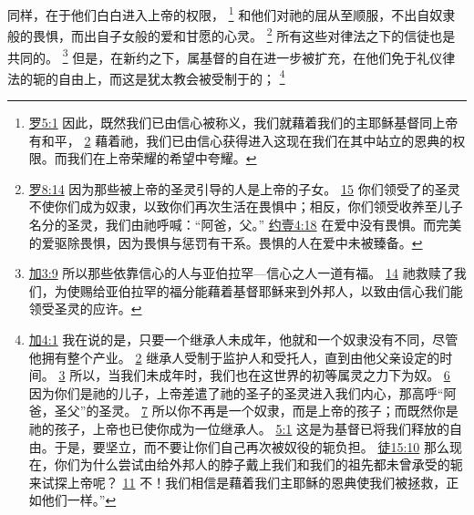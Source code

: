 \documentclass[12pt, a4paper, oneside]{ctexart}
\begin{document}
	同样，在于他们白白进入上帝的权限，
	\footnote {
		\href{https://biblehub.com/romans/5-1.htm}{罗5:1} 因此，既然我们已由信心被称义，我们就藉着我们的主耶稣基督同上帝有和平，
		\href{https://biblehub.com/romans/5-2.htm}{2} 藉着祂，我们已由信心获得进入这现在我们在其中站立的恩典的权限。而我们在上帝荣耀的希望中夸耀。

	}
	和他们对祂的屈从至顺服，不出自奴隶般的畏惧，而出自子女般的爱和甘愿的心灵。
	\footnote {
		\href{https://biblehub.com/romans/8-14.htm}{罗8:14} 因为那些被上帝的圣灵引导的人是上帝的子女。
		\href{https://biblehub.com/romans/8-15.htm}{15} 你们领受了的圣灵不使你们成为奴隶，以致你们再次生活在畏惧中；相反，你们领受收养至儿子名分的圣灵，我们由祂呼喊：“阿爸，父。”
		\href{https://biblehub.com/1_john/4-18.htm}{约壹4:18} 在爱中没有畏惧。而完美的爱驱除畏惧，因为畏惧与惩罚有干系。畏惧的人在爱中未被臻备。
	}
	所有这些对律法之下的信徒也是共同的。
	\footnote {
		\href{https://biblehub.com/galatians/3-9.htm}{加3:9} 所以那些依靠信心的人与亚伯拉罕---信心之人一道有福。
		\href{https://biblehub.com/galatians/3-14.htm}{14} 祂救赎了我们，为使赐给亚伯拉罕的福分能藉着基督耶稣来到外邦人，以致由信心我们能领受圣灵的应许。
	}
	但是，在新约之下，属基督的自在进一步被扩充，在他们免于礼仪律法的轭的自由上，而这是犹太教会被受制于的；
	\footnote {
		\href{https://biblehub.com/galatians/4-1.htm}{加4:1} 我在说的是，只要一个继承人未成年，他就和一个奴隶没有不同，尽管他拥有整个产业。
		\href{https://biblehub.com/galatians/4-2.htm}{2} 继承人受制于监护人和受托人，直到由他父亲设定的时间。
		\href{https://biblehub.com/galatians/4-3.htm}{3} 所以，当我们未成年时，我们也在这世界的初等属灵之力下为奴。
		\href{https://biblehub.com/galatians/4-6.htm}{6} 因为你们是祂的儿子，上帝差遣了祂的圣子的圣灵进入我们内心，那高呼“阿爸，圣父”的圣灵。
		\href{https://biblehub.com/galatians/4-7.htm}{7} 所以你不再是一个奴隶，而是上帝的孩子；而既然你是祂的孩子，上帝也已使你成为一位继承人。
		\href{https://biblehub.com/galatians/5-1.htm}{5:1} 这是为基督已将我们释放的自由。于是，要坚立，而不要让你们自己再次被奴役的轭负担。
		\href{https://biblehub.com/acts/15-10.htm}{徒15:10} 那么现在，你们为什么尝试由给外邦人的脖子戴上我们和我们的祖先都未曾承受的轭来试探上帝呢？
		\href{https://biblehub.com/acts/15-11.htm}{11} 不！我们相信是藉着我们主耶稣的恩典使我们被拯救，正如他们一样。”
	}
\end{document}
